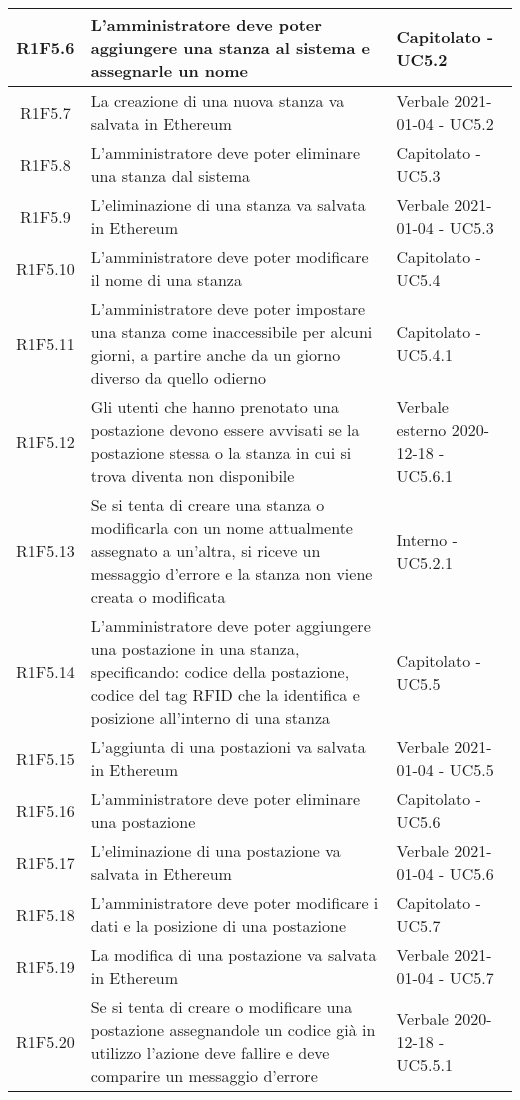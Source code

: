 \begin{center}
\begin{longtable}{|c|p{10cm}|p{4cm}|}
					\hline
				R1F5.6&L'amministratore deve poter aggiungere una stanza al sistema e assegnarle un nome	& Capitolato - UC5.2	\\
						\hline
				R1F5.7&	La creazione di una nuova stanza va salvata in Ethereum&Verbale 2021-01-04 - UC5.2 	\\
						\hline
				R1F5.8&L'amministratore deve poter eliminare una stanza dal sistema	& Capitolato - UC5.3	\\
						\hline
				R1F5.9&L'eliminazione di una stanza va salvata in Ethereum	& Verbale 2021-01-04 - UC5.3	\\
						\hline
				R1F5.10&L'amministratore deve poter modificare il nome di una stanza	& Capitolato - UC5.4	\\
						\hline
			R1F5.11&L'amministratore deve poter impostare una stanza come inaccessibile per alcuni giorni, a partire anche da un giorno diverso da quello odierno	& Capitolato - UC5.4.1	\\
					\hline
			R1F5.12&Gli utenti che hanno prenotato una postazione devono essere avvisati se la postazione stessa o la stanza in cui si trova diventa non disponibile	& Verbale esterno 2020-12-18 - UC5.6.1	\\
					\hline
R1F5.13&Se si tenta di creare una stanza o modificarla con un nome attualmente assegnato a un'altra, si riceve un messaggio d'errore e la stanza non viene creata o modificata	& Interno - UC5.2.1	\\
						\hline
			R1F5.14&L'amministratore deve poter aggiungere una postazione in una stanza, specificando: codice della postazione, codice del tag RFID che la identifica e posizione all'interno di una stanza	& Capitolato - UC5.5	\\
					\hline
			R1F5.15&L'aggiunta di una postazioni va salvata in Ethereum	&Verbale 2021-01-04 - UC5.5 	\\
					\hline
R1F5.16&L'amministratore deve poter eliminare una postazione	& Capitolato - UC5.6	\\
						\hline
		R1F5.17	&L'eliminazione di una postazione va salvata in Ethereum	& Verbale 2021-01-04 - UC5.6	\\
					\hline
			R1F5.18&L'amministratore deve poter modificare i dati e la posizione di una postazione	& Capitolato - UC5.7	\\
					\hline
R1F5.19&	La modifica di una postazione va salvata in Ethereum& Verbale 2021-01-04 - UC5.7	\\
					\hline
R1F5.20&	Se si tenta di creare o modificare una postazione assegnandole un codice già in utilizzo l'azione deve fallire e deve comparire un messaggio d'errore& Verbale 2020-12-18 - UC5.5.1 	\\

\end{longtable}
\end{center}
